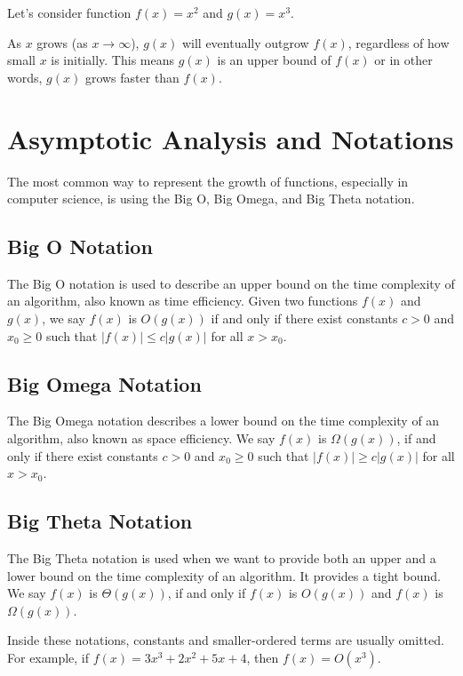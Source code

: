 Let's consider function $f(x) = x^2$ and $g(x) = x^3$. 

As $x$ grows (as $x \to \infty $), $g(x)$ will eventually outgrow $f(x)$, regardless of how small $x$ is initially. This means $g(x)$ is an upper bound of $f(x)$ or in other words, $g(x)$ grows faster than $f(x)$.

\section{Asymptotic Analysis and Notations}

The most common way to represent the growth of functions, especially in computer science, is using the Big O, Big Omega, and Big Theta notation.

\subsection{Big O Notation}

The Big O notation is used to describe an upper bound on the time complexity of an algorithm, also known as time efficiency. Given two functions $f(x)$ and $g(x)$, we say $f(x)$ is $O(g(x))$ if and only if there exist constants $c > 0$ and $x_0 \geq 0$ such that $|f(x)| \leq c|g(x)|$ for all $x > x_0$.

\subsection{Big Omega Notation}

The Big Omega notation describes a lower bound on the time complexity of an algorithm, also known as space efficiency. We say $f(x)$ is $\Omega(g(x))$, if and only if there exist constants $c > 0$ and $x_0 \geq 0$ such that $|f(x)| \geq c|g(x)|$ for all $x > x_0$.

\subsection{Big Theta Notation}

The Big Theta notation is used when we want to provide both an upper and a lower bound on the time complexity of an algorithm. It provides a tight bound. We say $f(x)$ is $\Theta(g(x))$, if and only if $f(x)$ is $O(g(x))$ and $f(x)$ is $\Omega(g(x))$.

Inside these notations, constants and smaller-ordered terms are usually omitted. For example, if $f(x) = 3x^3 + 2x^2 + 5x + 4$, then $f(x)=O(x^3)$.



